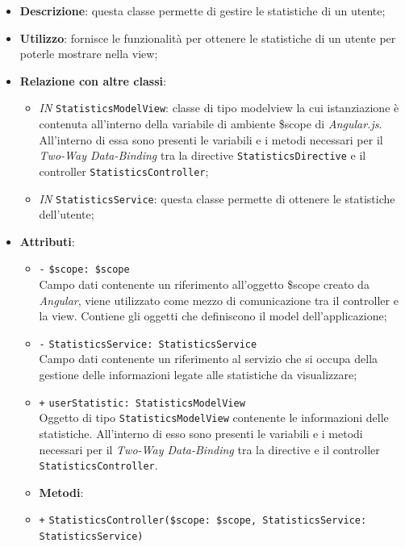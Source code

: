 \begin{itemize}
	\item \textbf{Descrizione}: questa classe permette di gestire le statistiche di un utente;
	\item \textbf{Utilizzo}: fornisce le funzionalità per ottenere le statistiche di un utente per poterle mostrare nella view;
	\item \textbf{Relazione con altre classi}:
	\begin{itemize}
		\item \textit{IN} \texttt{StatisticsModelView}: classe di tipo modelview la cui istanziazione è contenuta all'interno della variabile di ambiente \$scope di \textit{Angular.js}. All'interno di essa sono presenti le variabili e i metodi necessari per il \textit{Two-Way Data-Binding} tra la directive \texttt{StatisticsDirective} e il controller \texttt{StatisticsController}; 
		\item \textit{IN} \texttt{StatisticsService}: questa classe permette di ottenere le statistiche dell'utente;
	\end{itemize}
	\item \textbf{Attributi}:
	\begin{itemize}
		\item \texttt{-} \texttt{\$scope: \$scope} \\
		Campo dati contenente un riferimento all’oggetto \$scope creato da \textit{Angular}, viene utilizzato come mezzo di comunicazione tra il controller e la view. Contiene gli oggetti che definiscono il model dell’applicazione;
		\item \texttt{-} \texttt{StatisticsService: StatisticsService} \\
		Campo dati contenente un riferimento al servizio che si occupa della gestione delle informazioni legate alle statistiche da visualizzare;
		\item \texttt{+} \texttt{userStatistic: StatisticsModelView} \\ Oggetto di tipo \texttt{StatisticsModelView} contenente le informazioni delle statistiche. All'interno di esso sono presenti le variabili e i metodi necessari per il \textit{Two-Way Data-Binding} tra la directive e il controller \texttt{StatisticsController}.
	\end{itemize}	
	\begin{itemize}
		\item \textbf{Metodi}:
		\item \texttt{+} \texttt{StatisticsController(\$scope: \$scope, StatisticsService: StatisticsService)} \\ 

\end{itemize}
\end{itemize}
